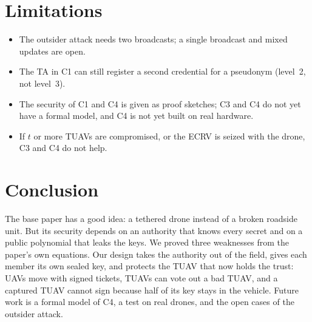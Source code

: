\documentclass[11pt,openany]{report}
\begin{document}
\section{Limitations}
\begin{itemize}[leftmargin=*]
\item The outsider attack needs two broadcasts; a single broadcast and mixed updates are open.
\item The TA in C1 can still register a second credential for a pseudonym (level~2, not level~3).
\item The security of C1 and C4 is given as proof sketches; C3 and C4 do not yet have a formal model, and C4 is not yet built on real hardware.
\item If $t$ or more TUAVs are compromised, or the ECRV is seized with the drone, C3 and C4 do not help.
\end{itemize}

\section{Conclusion}
The base paper has a good idea: a tethered drone instead of a broken roadside unit. But its security depends on an authority that knows every secret
and on a public polynomial that leaks the keys. We proved three weaknesses from the paper's own equations. Our design takes the authority out of the
field, gives each member its own sealed key, and protects the TUAV that now holds the trust: UAVs move with signed tickets, TUAVs can vote out a bad
TUAV, and a captured TUAV cannot sign because half of its key stays in the vehicle. Future work is a formal model of C4, a test on real drones, and
the open cases of the outsider attack.
\end{document}
